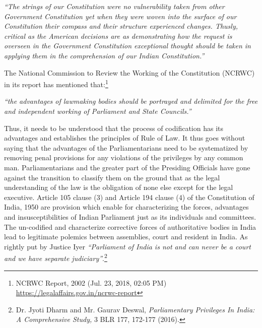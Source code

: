 \begin{multicols}{2}
\noi
\begin{quoting}
\textit{“The strings of our Constitution were no vulnerability taken from other Government
Constitution yet when they were woven into the surface of our Constitution their
compass and their structure experienced changes. Thusly, critical as the American
decisions are as demonstrating how the request is overseen in the Government
Constitution exceptional thought should be taken in applying them in the
comprehension of our Indian Constitution.”}
\end{quoting}

\vspace{-.4cm}

\noi
The National Commission to Review the Working of the Constitution (NCRWC) in its report
has mentioned that:\footnote{NCRWC Report, 2002 (Jul. 23, 2018, 02:05 PM) \url{https://legalaffairs.gov.in/ncrwc-report}}

\vspace{-.4cm}

\noi
\begin{quoting}
\textit{“the advantages of lawmaking bodies should be portrayed and delimited for the free
and independent working of Parliament and State Councils.”}
\end{quoting}

\vspace{-.4cm}

\noi
Thus, it needs to be understood that the process of codification has its advantages and
establishes the principles of Rule of Law. It thus goes without saying that the advantages of
the Parliamentarians need to be systematized by removing penal provisions for any violations
of the privileges by any common man. Parliamentarians and the greater part of the Presiding
Officials have gone against the transition to classify them on the ground that as the legal
understanding of the law is the obligation of none else except for the legal executive. Article
105 clause (3) and Article 194 clause (4) of the Constitution of India, 1950 are provision
which enable for characterizing the forces, advantages and insusceptibilities of Indian
Parliament just as its individuals and committees. The un-codified and characterize corrective
forces of authoritative bodies in India lead to legitimate polemics between assemblies, court
and resident in India. As rightly put by Justice Iyer \textit{“Parliament of India is not and can never
be a court and we have separate judiciary”}.\footnote{Dr. Jyoti Dharm and Mr. Gaurav Deswal, \textit{Parliamentary Privileges In India: A Comprehensive Study,} 3 BLR 177, 172-177 (2016).}
\end{multicols}
\label{end2019-art4}
